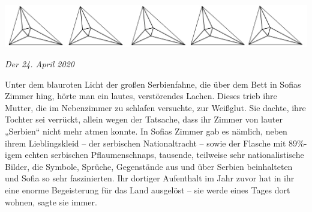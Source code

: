 \documentclass[oneside]{memoir}
\newcommand{\parasep}{
\bigskip
\bigskip
\begin{center} 
   \includegraphics[scale=.08]{parasep5.jpg} 
\end{center}
\bigskip
\bigskip
}
\begin{document}
\parasep

\textit{Der 24. April 2020}

\medskip
\noindent Unter dem blauroten Licht der großen Serbienfahne, die über dem Bett in Sofias Zimmer hing, hörte man ein lautes, verstörendes Lachen. Dieses trieb ihre Mutter, die im Nebenzimmer zu schlafen versuchte, zur Weißglut. Sie dachte, ihre Tochter sei verrückt, allein wegen der Tatsache, dass ihr Zimmer von lauter „Serbien“ nicht mehr atmen konnte. In Sofias Zimmer gab es nämlich, neben ihrem Lieblingskleid -- der serbischen Nationaltracht -- sowie der Flasche mit 89\%-igem echten serbischen Pflaumenschnaps, tausende, teilweise sehr nationalistische Bilder, die Symbole, Sprüche, Gegenstände aus und über Serbien beinhalteten und Sofia so sehr faszinierten. Ihr dortiger Aufenthalt im Jahr zuvor hat in ihr eine enorme Begeisterung für das Land ausgelöst -- sie werde eines Tages dort wohnen, sagte sie immer.
\end{document}
